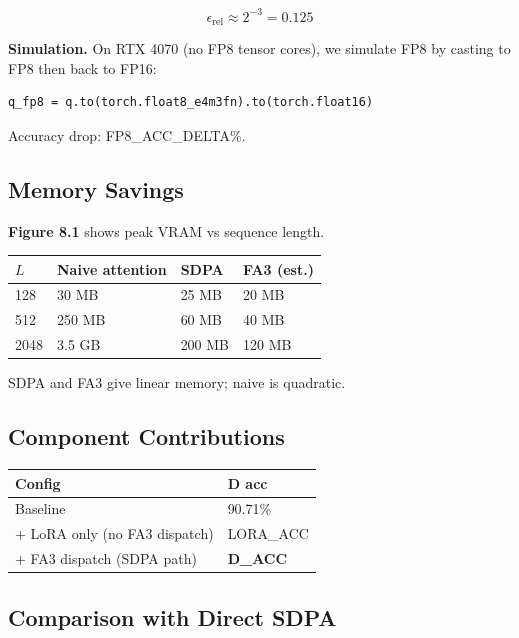 \[
\epsilon_{\text{rel}} \approx 2^{-3} = 0.125
\]

\textbf{Simulation.} On RTX 4070 (no FP8 tensor cores), we simulate FP8 by 
casting to FP8 then back to FP16:

\begin{lstlisting}
q_fp8 = q.to(torch.float8_e4m3fn).to(torch.float16)
\end{lstlisting}

Accuracy drop: {{FP8\_ACC\_DELTA}}\%.

\subsection{Memory Savings}

\textbf{Figure 8.1} shows peak VRAM vs sequence length.

\begin{table}[H]
\centering
\small
\begin{tabular}{llll}
\toprule
\textbf{$L$} & \textbf{Naive attention} & \textbf{SDPA} & \textbf{FA3 (est.)} \\
\midrule
128 & 30 MB & 25 MB & 20 MB \\
512 & 250 MB & 60 MB & 40 MB \\
2048 & 3.5 GB & 200 MB & 120 MB \\
\bottomrule
\end{tabular}
\end{table}

SDPA and FA3 give linear memory; naive is quadratic.

\subsection{Component Contributions}

\begin{table}[H]
\centering
\small
\begin{tabular}{ll}
\toprule
\textbf{Config} & \textbf{D acc} \\
\midrule
Baseline & 90.71\% \\
+ LoRA only (no FA3 dispatch) & {{LORA\_ACC}} \\
+ FA3 dispatch (SDPA path) & \textbf{{{D\_ACC}}} \\
\bottomrule
\end{tabular}
\end{table}

\subsection{Comparison with Direct SDPA}

